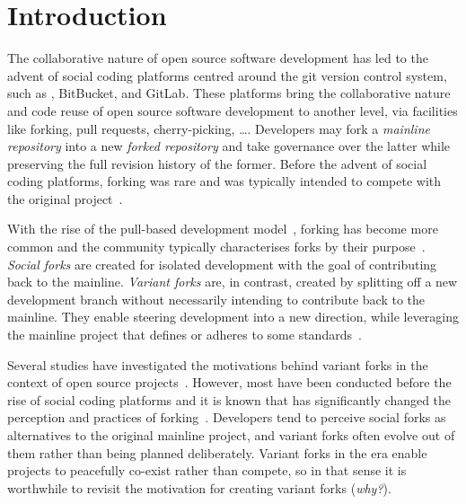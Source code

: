 \section{Introduction}
\label{sec:intro}

The collaborative nature of open source software development has led to the advent of social coding platforms centred around the git version control system, such as \gh, BitBucket, and GitLab.
These platforms bring the collaborative nature and code reuse of open source software development to another level, via facilities like forking, pull requests, cherry-picking, \ldots.
Developers may fork a \textit{mainline repository} into a new \textit{forked repository} and take governance over the latter while preserving the full revision history of the former.
Before the advent of social coding platforms, forking was rare and was typically intended to compete with the original project~\cite{Linus:2012Perspectives,Gregorio:2012,Viseur:2012Forks,Linus:2013CodeForking,Linus:2011ToFork,Gamalielsson:2014Sustainability}.

With the rise of the pull-based development model~\cite{Gousios:2014ICSE}, forking has become more common and the community typically characterises forks by their purpose~\cite{Zhou:2020}.
\textit{Social forks} are created for isolated development with the goal of contributing back to the mainline.
\textit{Variant forks} are, in contrast, created by splitting off a new development branch without necessarily intending to contribute back to the mainline.
They enable steering development into a new direction, while leveraging the mainline project that defines or adheres to some standards~\cite{sung:ICSE:2020}.


Several studies have investigated the motivations behind variant forks in the context of open source projects~\cite{Linus:2012Perspectives,Gregorio:2012,Viseur:2012Forks,Linus:2013CodeForking,Linus:2011ToFork,Gamalielsson:2014Sustainability}.
However, most have been conducted before the rise of social coding platforms and it is known that \gh has significantly changed the perception and practices of forking~\cite{Zhou:2020}.
Developers tend to perceive social forks as alternatives to the original mainline project, and variant forks often evolve out of them rather than being planned deliberately.
Variant forks in the \gh era enable projects to peacefully co-exist rather than compete, so in that sense it is worthwhile to revisit the motivation for creating variant forks (\textit{why?}).

